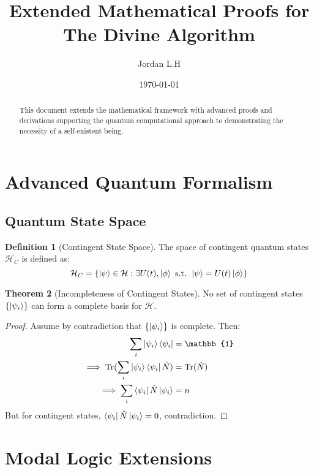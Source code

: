 \documentclass[12pt]{article}
\title{Extended Mathematical Proofs for The Divine Algorithm}
\author{Jordan L.H}
\date{\today}
\theoremstyle{definition}
\newtheorem{theorem}{Theorem}[section]
\newtheorem{definition}[theorem]{Definition}
\begin{document}
\maketitle

\begin{abstract}
This document extends the mathematical framework with advanced proofs and derivations supporting the quantum computational approach to demonstrating the necessity of a self-existent being.
\end{abstract}

\section{Advanced Quantum Formalism}

\subsection{Quantum State Space}

\begin{definition}[Contingent State Space]
The space of contingent quantum states $\mathcal{H}_C$ is defined as:
\begin{equation}
    \mathcal{H}_C = \{\ket{\psi} \in \mathcal{H} : \exists U(t), \ket{\phi} \text{ s.t. } \ket{\psi} = U(t)\ket{\phi}\}
\end{equation}
\end{definition}

\begin{theorem}[Incompleteness of Contingent States]
No set of contingent states $\{\ket{\psi_i}\}$ can form a complete basis for $\mathcal{H}$.
\end{theorem}

\begin{proof}
Assume by contradiction that $\{\ket{\psi_i}\}$ is complete. Then:
\begin{align}
    \sum_i \ket{\psi_i}\bra{\psi_i} &= \mathbb{1} \\
    \implies \text{Tr}(\sum_i \ket{\psi_i}\bra{\psi_i}\hat{N}) &= \text{Tr}(\hat{N}) \\
    \implies \sum_i \bra{\psi_i}\hat{N}\ket{\psi_i} &= n
\end{align}
But for contingent states, $\bra{\psi_i}\hat{N}\ket{\psi_i} = 0$, contradiction.
\end{proof}

\section{Modal Logic Extensions}
\end{document}
